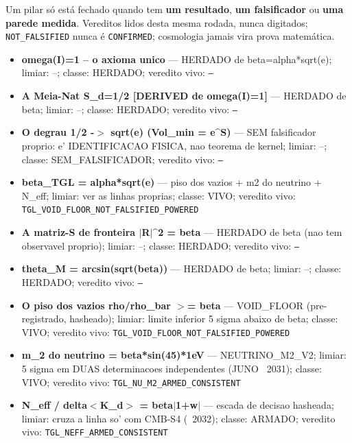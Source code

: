 \documentclass[11pt]{article}
\theoremstyle{definition}\newtheorem{deriv}{Derivação}
\begin{document}
Um pilar só está fechado quando tem \textbf{um resultado}, \textbf{um falsificador} ou \textbf{uma parede medida}. Vereditos lidos desta mesma rodada, nunca digitados; \texttt{NOT\_FALSIFIED} nunca é \texttt{CONFIRMED}; cosmologia jamais vira prova matemática.

\begin{itemize}

\item \textbf{omega(I)=1 -- o axioma unico} --- HERDADO de beta=alpha*sqrt(e); limiar: --; classe: HERDADO; veredito vivo: \texttt{--}

\item \textbf{A Meia-Nat S\_d=1/2 [DERIVED de omega(I)=1]} --- HERDADO de beta; limiar: --; classe: HERDADO; veredito vivo: \texttt{--}

\item \textbf{O degrau 1/2 -$>$ sqrt(e)  (Vol\_min = e\^{}S)} --- SEM falsificador proprio: e' IDENTIFICACAO FISICA, nao teorema de kernel; limiar: --; classe: SEM\_FALSIFICADOR; veredito vivo: \texttt{--}

\item \textbf{beta\_TGL = alpha*sqrt(e)} --- piso dos vazios + m2 do neutrino + N\_eff; limiar: ver as linhas proprias; classe: VIVO; veredito vivo: \texttt{TGL\_VOID\_FLOOR\_NOT\_FALSIFIED\_POWERED}

\item \textbf{A matriz-S de fronteira $|$R$|$\^{}2 = beta} --- HERDADO de beta (nao tem observavel proprio); limiar: --; classe: HERDADO; veredito vivo: \texttt{--}

\item \textbf{theta\_M = arcsin(sqrt(beta))} --- HERDADO de beta; limiar: --; classe: HERDADO; veredito vivo: \texttt{--}

\item \textbf{O piso dos vazios rho/rho\_bar $>$= beta} --- VOID\_FLOOR (pre-registrado, hasheado); limiar: limite inferior 5 sigma abaixo de beta; classe: VIVO; veredito vivo: \texttt{TGL\_VOID\_FLOOR\_NOT\_FALSIFIED\_POWERED}

\item \textbf{m\_2 do neutrino = beta*sin(45)*1eV} --- NEUTRINO\_M2\_V2; limiar: 5 sigma em DUAS determinacoes independentes (JUNO ~2031); classe: VIVO; veredito vivo: \texttt{TGL\_NU\_M2\_ARMED\_CONSISTENT}

\item \textbf{N\_eff / delta$<$K\_d$>$ = beta$|$1+w$|$} --- escada de decisao hasheada; limiar: cruza a linha so' com CMB-S4 (~2032); classe: ARMADO; veredito vivo: \texttt{TGL\_NEFF\_ARMED\_CONSISTENT}


\end{itemize}
\end{document}
